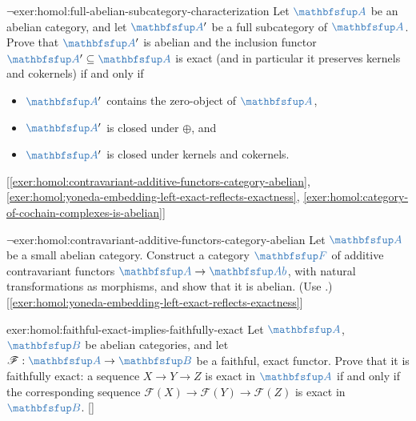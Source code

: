 \begin{exer}{$\lnot$}{exer:homol:full-abelian-subcategory-characterization}
  Let $\categ{A}$ be an abelian category, and let $\categ{A}'$ be a
  full subcategory of $\categ{A}$. Prove that $\categ{A}'$ is abelian
  and the inclusion functor $\categ{A}' \subseteq \categ{A}$ is exact
  (and in particular it preserves kernels and cokernels) if and only
  if
  \begin{itemize}
  \item $\categ{A}'$ contains the zero-object of $\categ{A}$,
  \item $\categ{A}'$ is closed under $\oplus$, and
  \item $\categ{A}'$ is closed under kernels and cokernels.
  \end{itemize}
  [\ref{exer:homol:contravariant-additive-functors-category-abelian},
  \ref{exer:homol:yoneda-embedding-left-exact-reflects-exactness},
  \ref{exer:homol:category-of-cochain-complexes-is-abelian}]
\end{exer}
\begin{exer}{$\lnot$}{exer:homol:contravariant-additive-functors-category-abelian}
  Let $\categ{A}$ be a small abelian category. Construct a category
  $\categ{F}$ of additive contravariant functors
  $\categ{A} \to \categ{Ab}$, with natural transformations as
  morphisms, and show that it is abelian. (Use
  .)
  [\ref{exer:homol:yoneda-embedding-left-exact-reflects-exactness}]
\end{exer}
\begin{exer}{}{exer:homol:faithful-exact-implies-faithfully-exact}
  \exerused{} Let $\categ{A}$, $\categ{B}$ be abelian categories, and
  let $\mathscr{F} : \categ{A} \to \categ{B}$ be a faithful, exact
  functor. Prove that it is faithfully exact: a sequence
  $X \to Y \to Z$ is exact in $\categ{A}$ if and only if the
  corresponding sequence
  $\mathscr{F}(X) \to \mathscr{F}(Y) \to \mathscr{F}(Z)$ is exact in
  $\categ{B}$. []
\end{exer}

